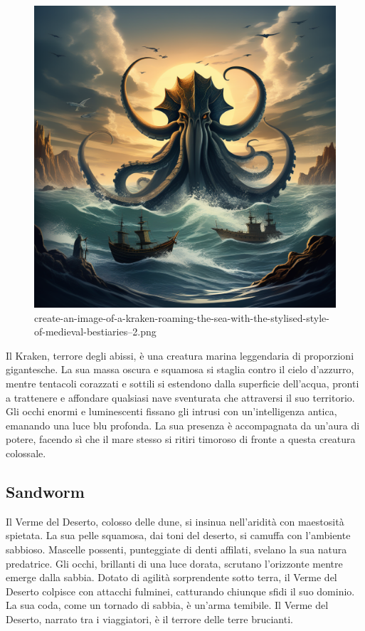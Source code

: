 \begin{figure}
\centering
\includegraphics{create-an-image-of-a-kraken-roaming-the-sea-with-the-stylised-style-of-medieval-bestiaries--2.png}
\caption{create-an-image-of-a-kraken-roaming-the-sea-with-the-stylised-style-of-medieval-bestiaries--2.png}
\end{figure}

Il Kraken, terrore degli abissi, è una creatura marina leggendaria di
proporzioni gigantesche. La sua massa oscura e squamosa si staglia
contro il cielo d'azzurro, mentre tentacoli corazzati e sottili si
estendono dalla superficie dell'acqua, pronti a trattenere e affondare
qualsiasi nave sventurata che attraversi il suo territorio. Gli occhi
enormi e luminescenti fissano gli intrusi con un'intelligenza antica,
emanando una luce blu profonda. La sua presenza è accompagnata da
un'aura di potere, facendo sì che il mare stesso si ritiri timoroso di
fronte a questa creatura colossale.

\subsection{Sandworm}\label{sandworm}

Il Verme del Deserto, colosso delle dune, si insinua nell'aridità con
maestosità spietata. La sua pelle squamosa, dai toni del deserto, si
camuffa con l'ambiente sabbioso. Mascelle possenti, punteggiate di denti
affilati, svelano la sua natura predatrice. Gli occhi, brillanti di una
luce dorata, scrutano l'orizzonte mentre emerge dalla sabbia. Dotato di
agilità sorprendente sotto terra, il Verme del Deserto colpisce con
attacchi fulminei, catturando chiunque sfidi il suo dominio. La sua
coda, come un tornado di sabbia, è un'arma temibile. Il Verme del
Deserto, narrato tra i viaggiatori, è il terrore delle terre brucianti.

